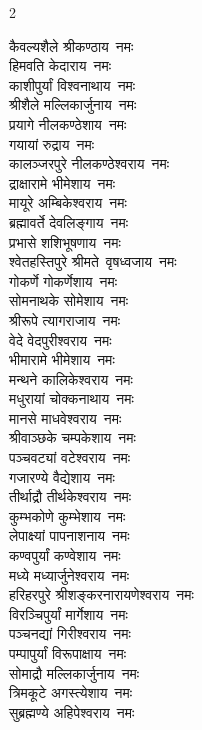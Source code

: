\begin{multicols}{2}
\begin{flushleft}
कैवल्यशैले श्रीकण्ठाय~नमः\\
हिमवति केदाराय~नमः\\
काशीपुर्यां विश्वनाथाय~नमः\\
श्रीशैले मल्लिकार्जुनाय~नमः\\
प्रयागे नीलकण्ठेशाय~नमः\\
गयायां रुद्राय~नमः\\
कालञ्जरपुरे नीलकण्ठेश्वराय~नमः\\
द्राक्षारामे भीमेशाय~नमः\\
मायूरे अम्बिकेश्वराय~नमः\\
ब्रह्मावर्ते देवलिङ्गाय~नमः\hfill{}\\
प्रभासे शशिभूषणाय~नमः\\
श्वेतहस्तिपुरे श्रीमते~वृषध्वजाय~नमः\\
गोकर्णे गोकर्णेशाय~नमः\\
सोमनाथके सोमेशाय~नमः\\
श्रीरूपे त्यागराजाय~नमः\\
वेदे वेदपुरीश्वराय~नमः\\
भीमारामे भीमेशाय~नमः\\
मन्थने कालिकेश्वराय~नमः\\
मधुरायां चोक्कनाथाय~नमः\\
मानसे माधवेश्वराय~नमः\hfill{}\\
श्रीवाञ्छके चम्पकेशाय~नमः\\
पञ्चवट्यां वटेश्वराय~नमः\\
गजारण्ये वैद्येशाय~नमः\\
तीर्थाद्रौ तीर्थकेश्वराय~नमः\\
कुम्भकोणे कुम्भेशाय~नमः\\
लेपाक्ष्यां पापनाशनाय~नमः\\
कण्वपुर्यां कण्वेशाय~नमः\\
मध्ये मध्यार्जुनेश्वराय~नमः\\
हरिहरपुरे श्रीशङ्करनारायणेश्वराय~नमः\\
विरञ्चिपुर्यां मार्गेशाय~नमः\hfill{}\\
पञ्चनद्यां गिरीश्वराय~नमः\\
पम्पापुर्यां विरूपाक्षाय~नमः\\
सोमाद्रौ मल्लिकार्जुनाय~नमः\\
त्रिमकूटे अगस्त्येशाय~नमः\\
सुब्रह्मण्ये अहिपेश्वराय~नमः\\

\end{flushleft}
\end{multicols}
